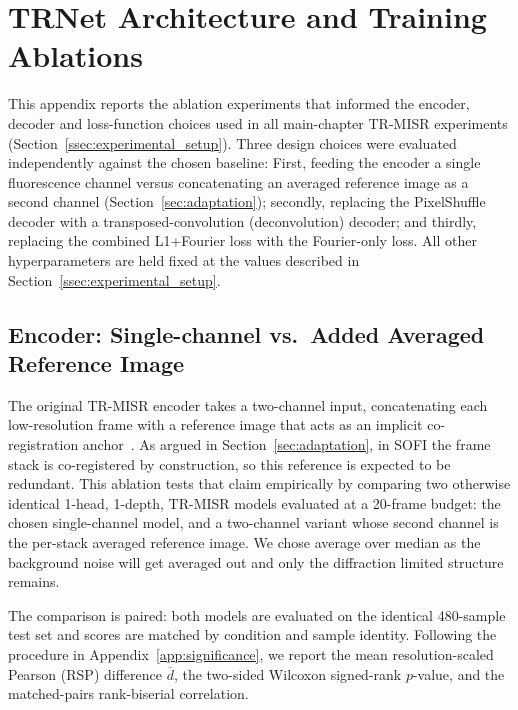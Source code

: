 \chapter{TRNet Architecture and Training Ablations}
\label{app:trnet_modifications}

This appendix reports the ablation experiments that informed the encoder, decoder and
loss-function choices used in all main-chapter TR-MISR experiments
(Section~\ref{ssec:experimental_setup}).
Three design choices were evaluated independently against the chosen baseline:
First, feeding the encoder a single fluorescence channel versus concatenating an averaged
reference image as a second channel (Section~\ref{sec:adaptation});
secondly, replacing the PixelShuffle decoder with a transposed-convolution (deconvolution) decoder;
and thirdly, replacing the combined L1+Fourier loss with the Fourier-only loss.
All other hyperparameters are held fixed at the values described in
Section~\ref{ssec:experimental_setup}.

\section{Encoder: Single-channel vs.\ Added Averaged Reference Image}
\label{app:encoder_ablation}

The original TR-MISR encoder takes a two-channel input, concatenating each
low-resolution frame with a reference image that acts as an implicit
co-registration anchor~\cite{TR-MISR-original}. As argued in
Section~\ref{sec:adaptation}, in SOFI the frame stack is co-registered by
construction, so this reference is expected to be redundant. This ablation tests
that claim empirically by comparing two otherwise identical 1-head, 1-depth, 
TR-MISR models evaluated at a 20-frame budget:
the chosen single-channel model, and a two-channel variant whose second channel
is the per-stack averaged reference image. We chose average over median as the background 
noise  will get averaged out and only the diffraction limited structure remains.

The comparison is paired: both models are evaluated on the identical 480-sample
test set and scores are matched by condition and sample identity. Following the
procedure in Appendix~\ref{app:significance}, we report the mean
resolution-scaled Pearson (RSP) difference $\overline{d}$, the two-sided
Wilcoxon signed-rank $p$-value, and the matched-pairs rank-biserial correlation.


